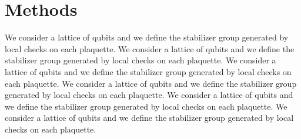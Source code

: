\documentclass{article}
\begin{document}
\section{Methods}
We consider a lattice of qubits and we define the stabilizer group generated by local checks on each plaquette. We consider a lattice of qubits and we define the stabilizer group generated by local checks on each plaquette. We consider a lattice of qubits and we define the stabilizer group generated by local checks on each plaquette. We consider a lattice of qubits and we define the stabilizer group generated by local checks on each plaquette. We consider a lattice of qubits and we define the stabilizer group generated by local checks on each plaquette. We consider a lattice of qubits and we define the stabilizer group generated by local checks on each plaquette.
\end{document}

